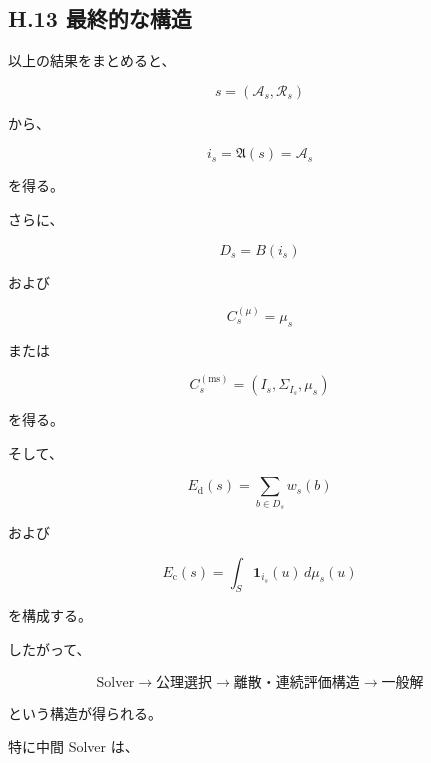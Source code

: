 \documentclass[a4paper,11pt]{article}
\newcommand{\Aset}{\mathcal{A}}
\newcommand{\Rset}{\mathcal{R}}
\begin{document}
\subsection{H.13 最終的な構造}

以上の結果をまとめると、

\begin{equation}
    s=(\Aset_s,\Rset_s)
\end{equation}

から、

\begin{equation}
    i_s
    =
    \mathfrak{A}(s)
    =
    \Aset_s
\end{equation}

を得る。

さらに、

\begin{equation}
    D_s=B(i_s)
\end{equation}

および

\begin{equation}
    C_s^{(\mu)}=\mu_s
\end{equation}

または

\begin{equation}
    C_s^{(\mathrm{ms})}
    =
    (I_s,\Sigma_{I_s},\mu_s)
\end{equation}

を得る。

そして、

\begin{equation}
    E_{\mathrm d}(s)
    =
    \sum_{b\in D_s}w_s(b)
\end{equation}

および

\begin{equation}
    E_{\mathrm c}(s)
    =
    \int_S
    \mathbf1_{i_s}(u)
    \,d\mu_s(u)
\end{equation}

を構成する。

したがって、

\begin{equation}
    \boxed{
        \text{Solver}
        \longrightarrow
        \text{公理選択}
        \longrightarrow
        \text{離散・連続評価構造}
        \longrightarrow
        \text{一般解}
    }
\end{equation}

という構造が得られる。

特に中間 Solver は、
\end{document}
